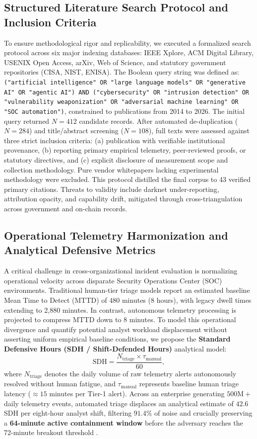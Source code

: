 \documentclass[conference,10pt,twocolumn,a4paper]{IEEEtran}
\begin{document}
\subsection{Structured Literature Search Protocol and Inclusion Criteria}
To ensure methodological rigor and replicability, we executed a formalized search protocol across six major indexing databases: IEEE Xplore, ACM Digital Library, USENIX Open Access, arXiv, Web of Science, and statutory government repositories (CISA, NIST, ENISA). The Boolean query string was defined as: \texttt{("artificial intelligence" OR "large language models" OR "generative AI" OR "agentic AI") AND ("cybersecurity" OR "intrusion detection" OR "vulnerability weaponization" OR "adversarial machine learning" OR "SOC automation")}, constrained to publications from 2014 to 2026. The initial query returned $N = 412$ candidate records. After automated de-duplication ($N = 284$) and title/abstract screening ($N = 108$), full texts were assessed against three strict inclusion criteria: (a) publication with verifiable institutional provenance, (b) reporting primary empirical telemetry, peer-reviewed proofs, or statutory directives, and (c) explicit disclosure of measurement scope and collection methodology. Pure vendor whitepapers lacking experimental methodology were excluded. This protocol distilled the final corpus to 43 verified primary citations. Threats to validity include darknet under-reporting, attribution opacity, and capability drift, mitigated through cross-triangulation across government and on-chain records.

\subsection{Operational Telemetry Harmonization and Analytical Defensive Metrics}
A critical challenge in cross-organizational incident evaluation is normalizing operational velocity across disparate Security Operations Center (SOC) environments. Traditional human-tier triage models report an estimated baseline Mean Time to Detect (MTTD) of 480 minutes (8 hours), with legacy dwell times extending to 2,880 minutes. In contrast, autonomous telemetry processing is projected to compress MTTD down to 8 minutes. To model this operational divergence and quantify potential analyst workload displacement without asserting uniform empirical baseline conditions, we propose the \textbf{Standard Defensive Hours (SDH / Shift-Defended Hours)} analytical model:
\begin{equation}
\mathrm{SDH} = \frac{N_{\mathrm{triage}} \times \tau_{\mathrm{manual}}}{60},
\end{equation}
where $N_{\mathrm{triage}}$ denotes the daily volume of raw telemetry alerts autonomously resolved without human fatigue, and $\tau_{\mathrm{manual}}$ represents baseline human triage latency ($\approx 15$ minutes per Tier-1 alert). Across an enterprise generating $500\text{M}+$ daily telemetry events, automated triage displaces an analytical estimate of $42.6$ SDH per eight-hour analyst shift, filtering $91.4\%$ of noise and crucially preserving a \textbf{64-minute active containment window} before the adversary reaches the 72-minute breakout threshold \cite{crowdstrike_gtr_2025, cisa_agentic_ai_2026}.
\end{document}
